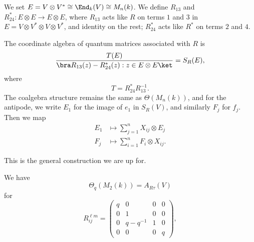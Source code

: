 \documentclass[a4paper]{article}
\begin{document}
We set $E = V \otimes V^* \cong \End_k(V) \cong M_n(k)$. We define $R_{13}$ and $R_{24}^*: E \otimes E \to E \otimes E$, where $R_{13}$ acts like $R$ on terms $1$ and $3$ in $E = V \otimes V^* \otimes V \otimes V^*$, and identity on the rest; $R_{24}^*$ acts like $R^*$ on terms $2$ and $4$.

\begin{defi}
  The coordinate algebra of quantum matrices associated with $R$ is
  \[
    \frac{T(E)}{ \bra R_{13}(z) - R_{24}^*(z): z \in E \otimes E\ket} = S_R(E),
  \]
  where
  \[
    T = R_{24}^* R_{13}^{-1}.
  \]
  The coalgebra structure remains the same as $\Theta(M_n(k))$, and for the antipode, we write $E_1$ for the image of $e_1$ in $S_R(V)$, and similarly $F_j$ for $f_j$. Then we map
  \begin{align*}
    E_1 &\mapsto \sum_{j = 1}^n X_{ij} \otimes E_j\\
    F_j &\mapsto \sum_{i = 1}^n F_i \otimes X_{ij}.
  \end{align*}
\end{defi}
This is the general construction we are up for.

\begin{eg}
  We have
  \[
    \Theta_q(M_2(k)) = A_{R\tau}(V)
  \]
  for
  \[
    R_{ij}^{\ell m} =
    \begin{pmatrix}
      q & 0 & 0 & 0\\
      0 & 1 & 0 & 0\\
      0 & q - q^{-1} & 1 & 0\\
      0 & 0 & 0 & q
    \end{pmatrix},
  \]
\end{eg}
\printindex
\end{document}
